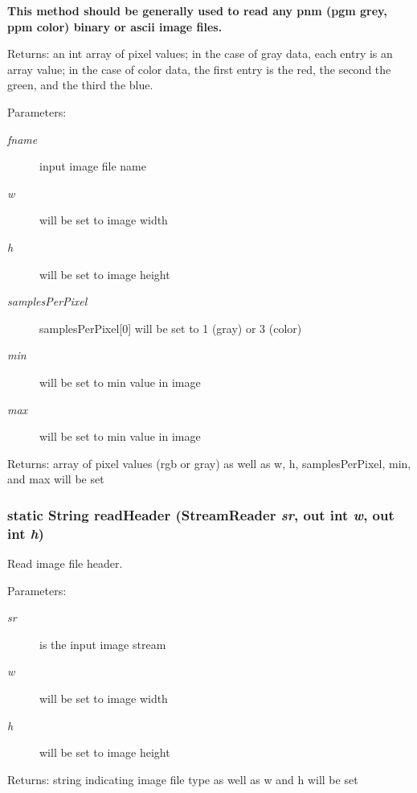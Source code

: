 {\bf  This method should be generally used to read any pnm (pgm grey, ppm color) binary or ascii image files. } 

\begin{Desc}
\item[Returns:]an int array of pixel values; in the case of gray data, each entry is an array value; in the case of color data, the first entry is the red, the second the green, and the third the blue.\end{Desc}
\begin{Desc}
\item[Parameters:]
\begin{description}
\item[{\em fname}]input image file name \item[{\em w}]will be set to image width \item[{\em h}]will be set to image height \item[{\em samples\-Per\-Pixel}]samples\-Per\-Pixel[0] will be set to 1 (gray) or 3 (color) \item[{\em min}]will be set to min value in image \item[{\em max}]will be set to min value in image\end{description}
\end{Desc}
\begin{Desc}
\item[Returns:]array of pixel values (rgb or gray) as well as w, h, samples\-Per\-Pixel, min, and max will be set \end{Desc}
\subsubsection{\setlength{\rightskip}{0pt plus 5cm}static String read\-Header (Stream\-Reader {\em sr}, out int {\em w}, out int {\em h})\hspace{0.3cm}{\tt  [static, protected]}}\label{class_c_s_image_viewer_1_1pnm_helper_a99b654bc67e0f3e658ea79b92aa7b3c}


Read image file header. 

\begin{Desc}
\item[Parameters:]
\begin{description}
\item[{\em sr}]is the input image stream \item[{\em w}]will be set to image width \item[{\em h}]will be set to image height\end{description}
\end{Desc}
\begin{Desc}
\item[Returns:]string indicating image file type as well as w and h will be set \end{Desc}
